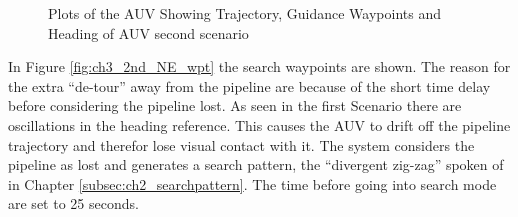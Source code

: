 		\begin{figure}[htbp]
			\caption[Trajectory plots of the 2nd scenario]{Plots of the AUV Showing Trajectory, 
			Guidance Waypoints and Heading of AUV second scenario}
			\label{fig:ch3_2nd_NE_plots}
		\end{figure}
		In Figure \ref{fig:ch3_2nd_NE_wpt} the search waypoints are shown. The reason for the extra
		``de-tour'' away from the pipeline are because of the short time delay before considering the
		pipeline lost. As seen in the first Scenario there are oscillations in the heading reference.
		This causes the AUV to drift off the pipeline trajectory and therefor lose visual contact
		with it. The system considers the pipeline as lost and generates a search pattern, the
		``divergent zig-zag'' spoken of in Chapter \ref{subsec:ch2_searchpattern}. The time before
		going into search mode are set to 25 seconds.

